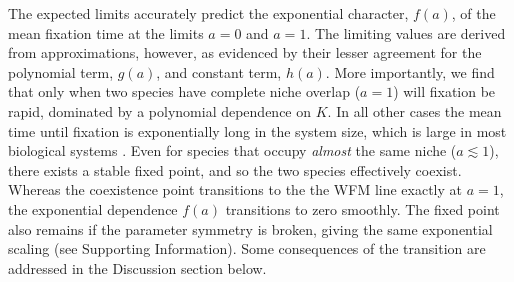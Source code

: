 \documentclass[a4paper,10pt]{article}
\numberwithin{equation}{section} %
\begin{document}
The expected limits accurately predict the exponential character, $f(a)$, of the mean fixation time at the limits $a=0$ and $a=1$. 
The limiting values are derived from approximations, however, as evidenced by their lesser agreement for the polynomial term, $g(a)$, and constant term, $h(a)$. 
More importantly, we find that only when two species have complete niche overlap ($a=1$) will fixation be rapid, dominated by a polynomial dependence on $K$. %
In all other cases the mean time until fixation is exponentially long in the system size, which is large in most biological systems \cite{Hanggi1990,Ovaskainen2010}. 
Even for species that occupy \emph{almost} the same niche ($a\lesssim1$), there exists a stable fixed point, and so the two species effectively coexist. 
Whereas the coexistence point transitions to the the WFM line exactly at $a=1$, the exponential dependence $f(a)$ transitions to zero smoothly. 
The fixed point also remains if the parameter symmetry is broken, giving the same exponential scaling (see Supporting Information). 
Some consequences of the transition are addressed in the Discussion section below. 
\end{document}
